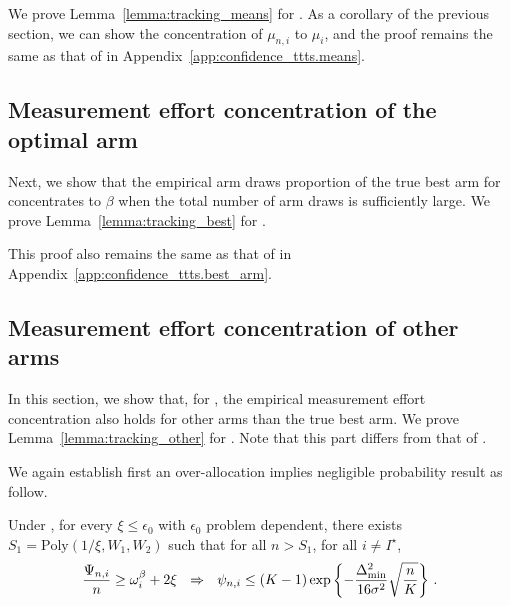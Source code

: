 We prove Lemma~\ref{lemma:tracking_means} for \TCC. As a corollary of the previous section, we can show the concentration of $\mu_{n,i}$ to $\mu_i$, and the proof remains the same as that of \TTTS in Appendix~\ref{app:confidence_ttts.means}.

\subsection{Measurement effort concentration of the optimal arm}\label{app:confidence_t3c.best_arm}

Next, we show that the empirical arm draws proportion of the true best arm for \TCC concentrates to $\beta$ when the total number of arm draws is sufficiently large. We prove Lemma~\ref{lemma:tracking_best} for \TCC.

This proof also remains the same as that of \TTTS in Appendix~\ref{app:confidence_ttts.best_arm}.

\subsection{Measurement effort concentration of other arms}\label{app:confidence_t3c.other_arms}

In this section, we show that, for \TCC, the empirical measurement effort concentration also holds for other arms than the true best arm. We prove Lemma~\ref{lemma:tracking_other} for \TCC. Note that this part differs from that of \TTTS.

We again establish first an over-allocation implies negligible probability result as follow.

\begin{lemma}\label{lemma:over_allocation_finite_t3c}
\begin{leftbar}[lemmabar]
    Under \TCC, for every $\xi \leq \epsilon_0$ with $\epsilon_0$ problem dependent, there exists $S_1 = \text{Poly}(1/\xi,W_1,W_2)$ such that for all $n > S_1$, for all $i\neq I^\star$, 
    \[
        \frac{\Psi_{n,i}}{n} \geq \omega_{i}^\beta + 2\xi  \ \ \Rightarrow \ \ \psi_{n,i} \leq (K-1)\exp\left\{-\frac{\Delta_{\text{min}}^2}{16\sigma^2}\sqrt{\frac{n}{K}}\right\}\,.
    \]
\end{leftbar}
\end{lemma}

